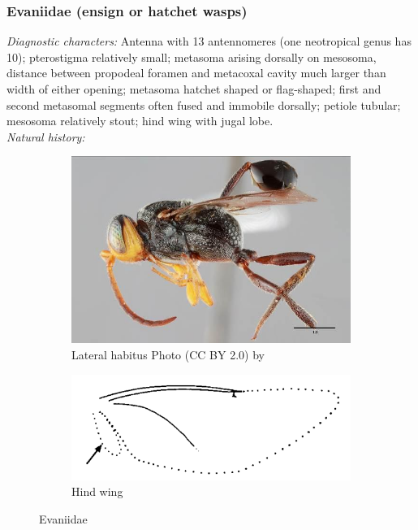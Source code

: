 \documentclass[letterpaper, 11pt]{article}
\begin{document}
\subsubsection{Evaniidae (ensign or hatchet wasps)}
\noindent{}\textit{Diagnostic characters:} Antenna with 13 antennomeres (one neotropical genus has 10); pterostigma relatively small; metasoma arising dorsally on mesosoma, distance between propodeal foramen and metacoxal cavity much larger than width of either opening; metasoma hatchet shaped or flag-shaped; first and second metasomal segments often fused and immobile dorsally; petiole tubular; mesosoma relatively stout; hind wing with jugal lobe.\\

\noindent{}\textit{Natural history:} \\

\begin{figure}[ht!]
  \centering
\begin{subfigure}[ht!]{0.45\textwidth}
    \includegraphics[width=\textwidth]{EvaniidHabitus}
  \caption{Lateral habitus Photo (CC BY 2.0) by \cite{MullinsEtAl2012}}
  \label{fig:evaniid1}
\end{subfigure}
    \hfill
\begin{subfigure}[ht!]{0.45\textwidth}
    \includegraphics[width=\textwidth]{EvaniidWing}
  \caption{Hind wing \citep[][pg. 510]{goulet1993hymenoptera}}
  \label{fig:evaniid2}
\end{subfigure}
    \caption{Evaniidae}
    \label{fig:evaniid}
\end{figure}
\end{document}
